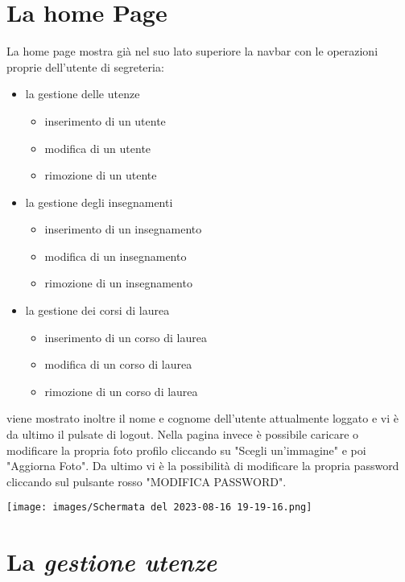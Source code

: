 \documentclass{article}
\begin{document}
    \section{La home Page}
    La home page mostra già nel suo lato superiore la navbar con le operazioni proprie dell'utente di segreteria:
    \begin{itemize}
        \item la gestione delle utenze
        \begin{itemize}
            \item inserimento di un utente
            \item modifica di un utente
            \item rimozione di un utente
        \end{itemize}
        \item la gestione degli insegnamenti
        \begin{itemize}
            \item inserimento di un insegnamento
            \item modifica di un insegnamento
            \item rimozione di un insegnamento
        \end{itemize}
        \item la gestione dei corsi di laurea
        \begin{itemize}
            \item inserimento di un corso di laurea
            \item modifica di un corso di laurea
            \item rimozione di un corso di laurea
        \end{itemize}
    \end{itemize}
    viene mostrato inoltre il nome e cognome dell'utente attualmente loggato e vi è da ultimo il pulsate di logout.
    Nella pagina invece è possibile caricare o modificare la propria foto profilo cliccando su "Scegli un'immagine" e poi "Aggiorna Foto".
    Da ultimo vi è la possibilità di modificare la propria password cliccando sul pulsante rosso "MODIFICA PASSWORD".

    \texttt{[image: images/Schermata del 2023-08-16 19-19-16.png]}

    \section{La \textit{gestione utenze}}
\end{document}
